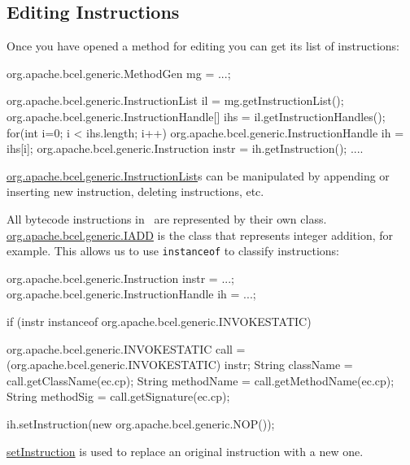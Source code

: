\subsection{Editing Instructions}
Once you have opened a method for editing you can
get its list of instructions:
\begin{listing}{1}
   org.apache.bcel.generic.MethodGen mg = ...;

   org.apache.bcel.generic.InstructionList il = mg.getInstructionList();
   org.apache.bcel.generic.InstructionHandle[] ihs = il.getInstructionHandles();
   for(int i=0; i < ihs.length; i++) {
      org.apache.bcel.generic.InstructionHandle ih = ihs[i];
      org.apache.bcel.generic.Instruction instr = ih.getInstruction();
         ....
   }
\end{listing}
\url{org.apache.bcel.generic.InstructionList}s can be manipulated 
by appending or inserting new instruction, deleting instructions, 
etc.

All bytecode instructions in \BCEL\ are represented by their
own class. \url{org.apache.bcel.generic.IADD} is the class
that represents integer addition, for example. This allows
us to use {\tt instanceof} to classify instructions:
\begin{listing}{1}
   org.apache.bcel.generic.Instruction instr = ...;
   org.apache.bcel.generic.InstructionHandle ih = ...;

   if (instr instanceof org.apache.bcel.generic.INVOKESTATIC) {
      org.apache.bcel.generic.INVOKESTATIC call =
        (org.apache.bcel.generic.INVOKESTATIC) instr;
      String className  = call.getClassName(ec.cp);
      String methodName = call.getMethodName(ec.cp);
      String methodSig  = call.getSignature(ec.cp);

      ih.setInstruction(new org.apache.bcel.generic.NOP());
   }
\end{listing}
\url{setInstruction} is used to replace an original 
instruction with a new one.

